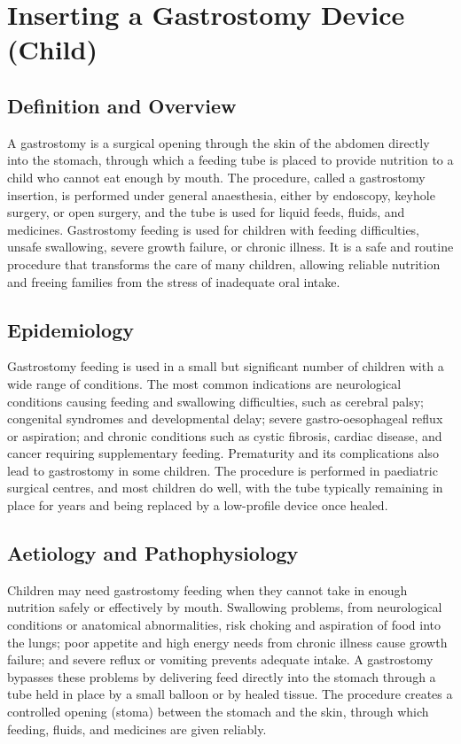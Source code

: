 \chapter{Inserting a Gastrostomy Device (Child)}

\section*{Definition and Overview}
A gastrostomy is a surgical opening through the skin of the abdomen directly into the stomach, through which a feeding tube is placed to provide nutrition to a child who cannot eat enough by mouth. The procedure, called a gastrostomy insertion, is performed under general anaesthesia, either by endoscopy, keyhole surgery, or open surgery, and the tube is used for liquid feeds, fluids, and medicines. Gastrostomy feeding is used for children with feeding difficulties, unsafe swallowing, severe growth failure, or chronic illness. It is a safe and routine procedure that transforms the care of many children, allowing reliable nutrition and freeing families from the stress of inadequate oral intake.

\section*{Epidemiology}
Gastrostomy feeding is used in a small but significant number of children with a wide range of conditions. The most common indications are neurological conditions causing feeding and swallowing difficulties, such as cerebral palsy; congenital syndromes and developmental delay; severe gastro-oesophageal reflux or aspiration; and chronic conditions such as cystic fibrosis, cardiac disease, and cancer requiring supplementary feeding. Prematurity and its complications also lead to gastrostomy in some children. The procedure is performed in paediatric surgical centres, and most children do well, with the tube typically remaining in place for years and being replaced by a low-profile device once healed.

\section*{Aetiology and Pathophysiology}
Children may need gastrostomy feeding when they cannot take in enough nutrition safely or effectively by mouth. Swallowing problems, from neurological conditions or anatomical abnormalities, risk choking and aspiration of food into the lungs; poor appetite and high energy needs from chronic illness cause growth failure; and severe reflux or vomiting prevents adequate intake. A gastrostomy bypasses these problems by delivering feed directly into the stomach through a tube held in place by a small balloon or by healed tissue. The procedure creates a controlled opening (stoma) between the stomach and the skin, through which feeding, fluids, and medicines are given reliably.

